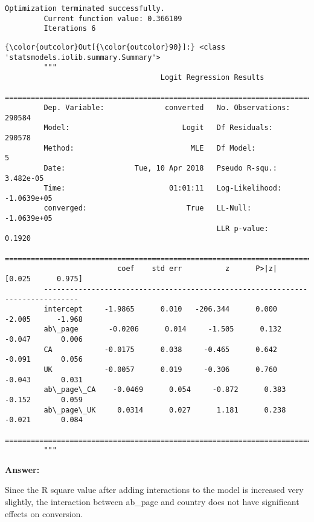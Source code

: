 \documentclass[11pt]{article}
\begin{document}
    \begin{Verbatim}[commandchars=\\\{\}]
Optimization terminated successfully.
         Current function value: 0.366109
         Iterations 6

    \end{Verbatim}

\begin{Verbatim}[commandchars=\\\{\}]
{\color{outcolor}Out[{\color{outcolor}90}]:} <class 'statsmodels.iolib.summary.Summary'>
         """
                                    Logit Regression Results                           
         ==============================================================================
         Dep. Variable:              converted   No. Observations:               290584
         Model:                          Logit   Df Residuals:                   290578
         Method:                           MLE   Df Model:                            5
         Date:                Tue, 10 Apr 2018   Pseudo R-squ.:               3.482e-05
         Time:                        01:01:11   Log-Likelihood:            -1.0639e+05
         converged:                       True   LL-Null:                   -1.0639e+05
                                                 LLR p-value:                    0.1920
         ==============================================================================
                          coef    std err          z      P>|z|      [0.025      0.975]
         ------------------------------------------------------------------------------
         intercept     -1.9865      0.010   -206.344      0.000      -2.005      -1.968
         ab\_page       -0.0206      0.014     -1.505      0.132      -0.047       0.006
         CA            -0.0175      0.038     -0.465      0.642      -0.091       0.056
         UK            -0.0057      0.019     -0.306      0.760      -0.043       0.031
         ab\_page\_CA    -0.0469      0.054     -0.872      0.383      -0.152       0.059
         ab\_page\_UK     0.0314      0.027      1.181      0.238      -0.021       0.084
         ==============================================================================
         """
\end{Verbatim}
            
    \textbf{Answer:}

Since the R square value after adding interactions to the model is
increased very slightly, the interaction between ab\_page and country
does not have significant effects on conversion.
\end{document}
